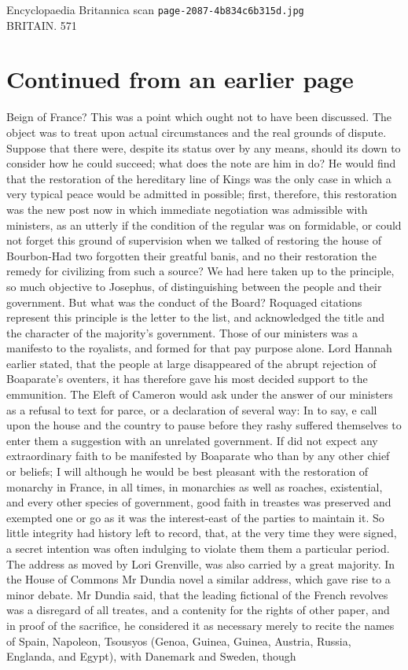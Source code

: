 \documentclass{article}
\begin{document}
\begin{center}
{\Large Encyclopaedia Britannica scan \texttt{page-2087-4b834c6b315d.jpg}}\\[0.5em]
BRITAIN. 571
\end{center}
\section*{Continued from an earlier page}
Beign of France? This was a point which ought not to have been discussed. The object was to treat upon actual circumstances and the real grounds of dispute. Suppose that there were, despite its status over by any means, should its down to consider how he could succeed; what does the note are him in do? He would find that the restoration of the hereditary line of Kings was the only case in which a very typical peace would be admitted in possible; first, therefore, this restoration was the new post now in which immediate negotiation was admissible with ministers, as an utterly if the condition of the regular was on formidable, or could not forget this ground of supervision when we talked of restoring the house of Bourbon-Had two forgotten their greatful banis, and no their restoration the remedy for civilizing from such a source? We had here taken up to the principle, so much objective to Josephus, of distinguishing between the people and their government. But what was the conduct of the Board? Roquaged citations represent this principle is the letter to the list, and acknowledged the title and the character of the majority’s government. Those of our ministers was a manifesto to the royalists, and formed for that pay purpose alone. Lord Hannah earlier stated, that the people at large disappeared of the abrupt rejection of Boaparate's oventers, it has therefore gave his most decided support to the emmunition. The Eleft of Cameron would ask under the answer of our ministers as a refusal to text for parce, or a declaration of several way: In to say, e call upon the house and the country to pause before they rashy suffered themselves to enter them a suggestion with an unrelated government. If did not expect any extraordinary faith to be manifested by Boaparate who than by any other chief or beliefs; I will although he would be best pleasant with the restoration of monarchy in France, in all times, in monarchies as well as roaches, existential, and every other species of government, good faith in treastes was preserved and exempted one or go as it was the interest-east of the parties to maintain it. So little integrity had history left to record, that, at the very time they were signed, a secret intention was often indulging to violate them them a particular period. The address as moved by Lori Grenville, was also carried by a great majority. In the House of Commons Mr Dundia novel a similar address, which gave rise to a minor debate. Mr Dundia said, that the leading fictional of the French revolves was a disregard of all treates, and a contenity for the rights of other paper, and in proof of the sacrifice, he considered it as necessary merely to recite the names of Spain, Napoleon, Tsousyos (Genoa, Guinea, Guinea, Austria, Russia, Englanda, and Egypt), with Danemark and Sweden, though 
\end{document}

